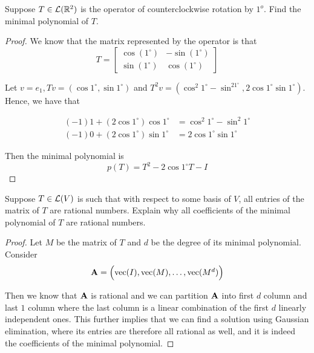 \documentclass{extarticle}
\begin{document}
\begin{problem}{8}
    Suppose \(T \in \mathcal{L}(\mathbb{R}^2)\) is the operator of counterclockwise rotation by \(1^o\). Find the minimal 
    polynomial of \(T\). 
\end{problem}

\begin{proof}
We know that the matrix represented by the operator is that 
\[T = \begin{bmatrix}
    \cos(1^\circ)    &  -\sin(1^\circ) \\ 
    \sin(1^\circ)    &  \cos(1^\circ)
\end{bmatrix}\]

Let \(v = e_1, Tv = (\cos1^\circ, \sin 1^\circ)\) and 
\(T^2v = (\cos^2 1^\circ - \sin^21^\circ, 2\cos 1^\circ \sin 1^\circ)\). Hence, we have that 

\begin{align*}
    (-1)1 + (2 \cos 1^\circ)\cos 1^\circ &= \cos^2 1^\circ - \sin^2 1^\circ  \\ 
    (-1)0 + (2 \cos 1^\circ)\sin 1^\circ &= 2 \cos 1^\circ \sin 1^\circ 
\end{align*}

Then the minimal polynomial is 
\[p(T) = T^2 - 2 \cos 1^\circ T - I\]
\end{proof}

\begin{problem}{9}
    Suppose \(T \in \mathcal{L}(V)\) is such that with respect to some basis of \(V\), all entries of the matrix 
    of \(T\) are rational numbers. Explain why all coefficients of the minimal polynomial of 
    \(T\) are rational numbers. 
\end{problem}

\begin{proof}
Let \(M\) be the matrix of \(T\) and \(d\) be the degree of its minimal polynomial. Consider 
\[\mathbf{A} = \begin{pmatrix}
    \text{vec}(I), \text{vec}(M), \ldots, \text{vec}(M^d)
\end{pmatrix}\]

Then we know that \(\mathbf{A}\) is rational and we can partition \(\mathbf{A}\) into first \(d\) column and last \(1\) 
column where the last column is a linear combination of the first \(d\) linearly independent ones. This further 
implies that we can find a solution using Gaussian elimination, where its entries are therefore all rational 
as well, and it is indeed the coefficients of the minimal polynomial. 
\end{proof}
\end{document}
